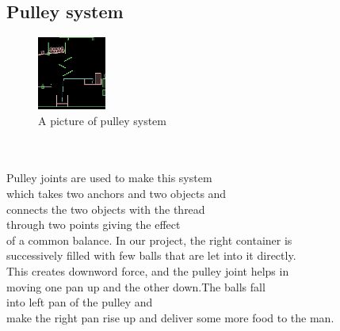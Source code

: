\subsection{Pulley system}
\begin{figure}
	\caption{A picture of pulley system}
	\centering
	 \includegraphics[width=0.2\textwidth]{./doc/pulley.png}%
\end{figure}
\begin{frame}
\centering
\\
\\
Pulley joints are used to make this system\\which takes two anchors and two objects and \\connects the two objects with the thread\\ through two points giving the effect\\ of a common balance. In our project, the right container is \\successively filled with few balls that are let into it directly. \\This creates downword force, and the pulley joint helps in\\ moving one pan up and the other down.The balls fall \\into left pan of the pulley and \\make the right pan rise up and deliver some more food to the man.
\end{frame}
\\
\\


